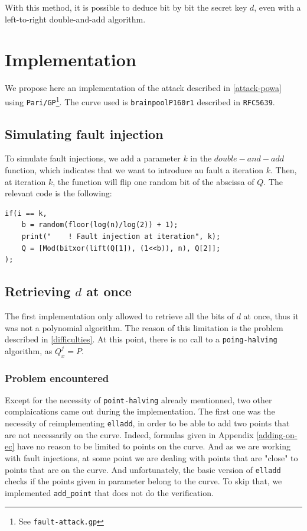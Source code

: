 \documentclass[journal]{IEEEtran}
\begin{document}
With this method, it is possible to deduce bit by bit the secret key $d$, even with a left-to-right double-and-add algorithm.

\section{Implementation}
We propose here an implementation of the attack described in \ref{attack-powa} using {\tt Pari/GP}\footnote{See {\tt fault-attack.gp}}. The curve used is {\tt brainpoolP160r1} described in {\tt RFC5639}.

\subsection{Simulating fault injection}
To simulate fault injections, we add a parameter $k$ in the $double-and-add$ function, which indicates that we want to introduce au fault a iteration $k$. Then, at iteration $k$, the function will flip one random bit of
the abscissa of $Q$. The relevant code is the following: 

\begin{footnotesize}
\begin{verbatim}
if(i == k,
    b = random(floor(log(n)/log(2)) + 1);
    print("    ! Fault injection at iteration", k);
    Q = [Mod(bitxor(lift(Q[1]), (1<<b)), n), Q[2]];
);
\end{verbatim}
\end{footnotesize}

\subsection{Retrieving $d$ at once}
The first implementation only allowed to retrieve all the bits of $d$ at once, thus it was not a polynomial algorithm. The reason of this limitation is the problem described in \ref{difficulties}.
At this point, there is no call to a {\tt poing-halving} algorithm, as $Q_x^{j} = P$.\\

\subsubsection{Problem encountered}
Except for the necessity of {\tt point-halving} already mentionned, two other complaications came out during the implementation. The first one was the necessity of reimplementing {\tt elladd}, in 
order to be able to add two points that are not necessarily on the curve. Indeed, formulas given in Appendix \ref{adding-on-ec} have no reason to be limited to points on the curve. And as we are working with 
fault injections, at some point we are dealing with points that are "close" to points that are on the curve. And unfortunately, the basic version of {\tt elladd} checks if the points given in parameter belong to the curve.
To skip that, we implemented {\tt add\_point} that does not do the verification.\\ 
\end{document}
